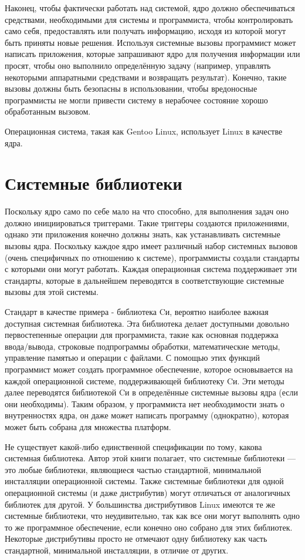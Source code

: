 \documentclass[12pt]{book}
\begin{document}
Наконец, чтобы фактически работать над системой, ядро должно обеспечиваться средствами, необходимыми для системы и программиста, чтобы контролировать само себя, предоставлять или получать информацию, исходя из которой могут быть приняты новые решения. Используя системные вызовы программист может написать приложения, которые запрашивают ядро для получения информации или просят, чтобы оно выполнило определённую задачу (например, управлять некоторыми аппаратными средствами и возвращать результат). Конечно, такие вызовы должны быть безопасны в использовании,  чтобы вредоносные программисты не могли привести систему в нерабочее состояние  хорошо обработанным вызовом.

Операционная система, такая как Gentoo Linux, использует Linux в качестве ядра.

\section{Системные библиотеки}

Поскольку ядро само по себе мало на что способно, для выполнения задач оно должно инициироваться триггерами. Такие триггеры создаются приложениями, однако эти приложения  конечно должны знать, как устанавливать системные вызовы ядра. Поскольку каждое ядро имеет различный набор системных вызовов (очень специфичных по отношению к системе), программисты создали стандарты с которыми они могут работать. Каждая операционная система поддерживает эти стандарты, которые в дальнейшем переводятся в соответствующие системные вызовы для этой системы.

Стандарт в качестве примера - библиотека Cи, вероятно наиболее важная доступная системная библиотека. Эта библиотека делает доступными довольно первостепенные операции для программиста, такие как основная поддержка ввода/вывода, строковые подпрограммы обработки, математические методы, управление памятью и операции с файлами. С помощью этих функций программист может создать программное обеспечение, которое основывается на каждой операционной системе, поддерживающей библиотеку Cи. Эти методы далее  переводятся библиотекой Cи в определённые системные вызовы ядра (если они необходимы). Таким образом, у программиста нет необходимости знать о внутренностях ядра, он даже может написать программу (однократно), которая может быть собрана для множества платформ.

Не существует какой-либо единственной спецификации по тому, какова системная библиотека. Автор этой книги полагает, что системные библиотеки — это любые библиотеки, являющиеся частью стандартной, минимальной инсталляции операционной системы. Также системные библиотеки для одной операционной системы (и даже дистрибутив) могут отличаться от аналогичных библиотек для другой. У большинства дистрибутивов Linux имеются те же системные библиотеки, что неудивительно, так как все они могут выполнять одно то же программное обеспечение, если конечно оно собрано для этих библиотек. Некоторые дистрибутивы просто не отмечают одну библиотеку как часть стандартной, минимальной инсталляции, в отличие от других.
\end{document}
